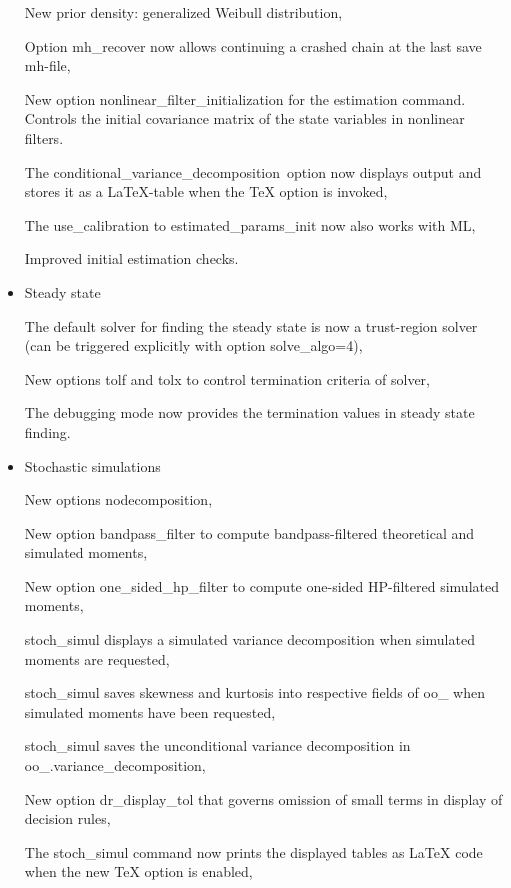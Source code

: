 \documentclass[cn,10pt,math=newtx,citestyle=gb7714-2015,bibstyle=gb7714-2015]{elegantbook}
\begin{document}
\begin{itemize}
		
		New prior density: generalized Weibull distribution,
		
		
		Option mh\_recover now allows continuing a crashed chain at the last save mh-file,
		
		
		New option nonlinear\_filter\_initialization for the estimation command. Controls the initial covariance matrix of the state variables in nonlinear filters.
		
		
		The conditional\_variance\_decomposition option now displays output and stores it as a LaTeX-table when the TeX option is invoked,
		
		
		The use\_calibration to estimated\_params\_init now also works with ML,
		
		
		Improved initial estimation checks.
		
		
		
		
		\item Steady state
		
		
		The default solver for finding the steady state is now a trust-region solver (can be triggered explicitly with option
		solve\_algo=4),
		
		
		New options tolf and tolx to control termination criteria of solver,
		
		
		The debugging mode now provides the termination values in steady state finding.
		
		
		
		
		\item Stochastic simulations
		
		
		New options nodecomposition,
		
		
		New option bandpass\_filter to compute bandpass-filtered theoretical and simulated moments,
		
		
		New option one\_sided\_hp\_filter to compute one-sided HP-filtered simulated moments,
		
		
		stoch\_simul displays a simulated variance decomposition when simulated moments are requested,
		
		
		stoch\_simul saves skewness and kurtosis into respective fields of oo\_ when simulated moments have been requested,
		
		
		stoch\_simul saves the unconditional variance decomposition in oo\_.variance\_decomposition,
		
		
		New option dr\_display\_tol that governs omission of small terms in display of decision rules,
		
		
		The stoch\_simul command now prints the displayed tables as LaTeX code when the new TeX option is enabled,
		

\end{itemize}
\end{document}
